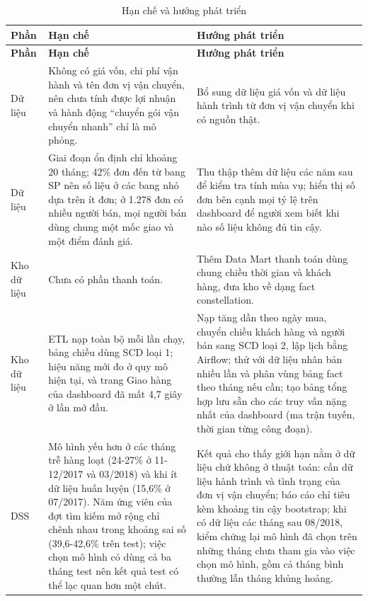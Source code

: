 \begingroup\small{}
\begin{longtable}{|P{1.9cm}|>{\raggedright\arraybackslash}p{5.9cm}|>{\raggedright\arraybackslash}p{5.9cm}|}
\caption{Hạn chế và hướng phát triển}\label{tab:huongphattrien}\\
\hline
\textbf{Phần} & \textbf{Hạn chế} & \textbf{Hướng phát triển}\\ \hline \endfirsthead
\hline
\textbf{Phần} & \textbf{Hạn chế} & \textbf{Hướng phát triển}\\ \hline \endhead
Dữ liệu & Không có giá vốn, chi phí vận hành và tên đơn vị vận chuyển, nên chưa tính được lợi nhuận và hành động ``chuyển gói vận chuyển nhanh'' chỉ là mô phỏng. & Bổ sung dữ liệu giá vốn và dữ liệu hành trình từ đơn vị vận chuyển khi có nguồn thật.\\ \hline
Dữ liệu & Giai đoạn ổn định chỉ khoảng 20 tháng; 42\% đơn đến từ bang SP nên số liệu ở các bang nhỏ dựa trên ít đơn; ở 1.278 đơn có nhiều người bán, mọi người bán dùng chung một mốc giao và một điểm đánh giá. & Thu thập thêm dữ liệu các năm sau để kiểm tra tính mùa vụ; hiển thị số đơn bên cạnh mọi tỷ lệ trên dashboard để người xem biết khi nào số liệu không đủ tin cậy.\\ \hline
Kho dữ liệu & Chưa có phần thanh toán. & Thêm Data Mart thanh toán dùng chung chiều thời gian và khách hàng, đưa kho về dạng fact constellation.\\ \hline
Kho dữ liệu & ETL nạp toàn bộ mỗi lần chạy, bảng chiều dùng SCD loại 1; hiệu năng mới đo ở quy mô hiện tại, và trang Giao hàng của dashboard đã mất 4,7 giây ở lần mở đầu. & Nạp tăng dần theo ngày mua, chuyển chiều khách hàng và người bán sang SCD loại 2, lập lịch bằng Airflow; thử với dữ liệu nhân bản nhiều lần và phân vùng bảng fact theo tháng nếu cần; tạo bảng tổng hợp lưu sẵn cho các truy vấn nặng nhất của dashboard (ma trận tuyến, thời gian từng công đoạn).\\ \hline
DSS & Mô hình yếu hơn ở các tháng trễ hàng loạt (24-27\% ở 11-12/2017 và 03/2018) và khi ít dữ liệu huấn luyện (15,6\% ở 07/2017). Năm ứng viên của đợt tìm kiếm mở rộng chỉ chênh nhau trong khoảng sai số (39,6-42,6\% trên test); việc chọn mô hình có dùng cả ba tháng test nên kết quả test có thể lạc quan hơn một chút. & Kết quả cho thấy giới hạn nằm ở dữ liệu chứ không ở thuật toán: cần dữ liệu hành trình và tình trạng của đơn vị vận chuyển; báo cáo chỉ tiêu kèm khoảng tin cậy bootstrap; khi có dữ liệu các tháng sau 08/2018, kiểm chứng lại mô hình đã chọn trên những tháng chưa tham gia vào việc chọn mô hình, gồm cả tháng bình thường lẫn tháng khủng hoảng.\\ \hline

\end{longtable}
